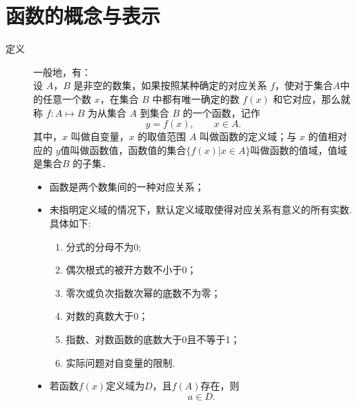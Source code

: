 \section{函数的概念与表示}
  \begin{description}
    \item [定义] 一般地，有：\\
      设 $A$，$B$ 是非空的数集，如果按照某种确定的对应关系 $f$，使对于集合$A$中的任意一个数 $x$，在集合 $B$ 中都有唯一确定的数 $f(x)$ 和它对应，那么就称 $f\colon A\mapsto B$ 为从集合 $A$ 到集合 $B$ 的一个函数，记作
      $$y=f(x),\qquad x\in A.$$
      其中，$x$ 叫做自变量，$x$ 的取值范围 $A$ 叫做函数的定义域；与 $x$ 的值相对应的 $y $值叫做函数值，函数值的集合$\{f(x)|x\in A\}$叫做函数的值域，值域是集合$B$ 的子集．
      \begin{itemize}[leftmargin=*]
        \kaishu
        \item 函数是两个数集间的一种对应关系；
        \item 未指明定义域的情况下，默认定义域取使得对应关系有意义的所有实数. 具体如下:
        \begin{enumerate}[label=\circled{\arabic*}]
          \item 分式的分母不为0;
          \item 偶次根式的被开方数不小于0；
          \item 零次或负次指数次幂的底数不为零；
          \item 对数的真数大于0；
          \item 指数、对数函数的底数大于0且不等于1；
          \item 实际问题对自变量的限制.
        \end{enumerate}
        \item 若函数$f(x)$定义域为$D$，且$f(A)$存在，则$$a\in D.$$
      \end{itemize}
  \end{description}
